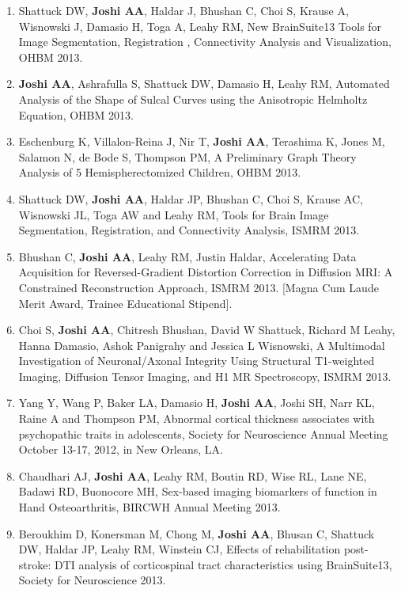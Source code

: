 \documentclass[overlapped,line,letterpaper]{res}
\begin{document}
\begin{resume}
\begin{enumerate}
    \item Shattuck DW, \textbf{Joshi AA}, Haldar J, Bhushan C, Choi S, Krause A, Wisnowski J, Damasio H, Toga A, Leahy RM, {New BrainSuite13 Tools for Image Segmentation, Registration , Connectivity Analysis and Visualization}, OHBM 2013.

    \item \textbf{Joshi AA}, Ashrafulla S, Shattuck DW, Damasio H, Leahy RM, {Automated Analysis of the Shape of Sulcal Curves using the Anisotropic Helmholtz Equation}, OHBM 2013.

    \item Eschenburg K, Villalon-Reina J, Nir T, \textbf{Joshi AA}, Terashima K, Jones M, Salamon N, de Bode S, Thompson PM, {A Preliminary Graph Theory Analysis of 5 Hemispherectomized Children}, OHBM 2013.

    \item Shattuck DW, \textbf{Joshi AA}, Haldar JP, Bhushan C, Choi S, Krause AC, Wisnowski JL, Toga AW and Leahy RM, {Tools for Brain Image Segmentation, Registration, and Connectivity Analysis}, ISMRM 2013. 

    \item Bhushan C, \textbf{Joshi AA}, Leahy RM, Justin Haldar, Accelerating Data Acquisition for Reversed-Gradient Distortion Correction in Diffusion MRI: A Constrained Reconstruction Approach, ISMRM 2013. [Magna Cum Laude Merit Award, Trainee Educational Stipend].

    \item Choi S, \textbf{Joshi AA}, Chitresh Bhushan, David W Shattuck, Richard M Leahy, Hanna Damasio, Ashok Panigrahy and Jessica L Wisnowski, A Multimodal Investigation of Neuronal/Axonal Integrity Using Structural T1-weighted Imaging, Diffusion Tensor Imaging, and H1 MR Spectroscopy, ISMRM 2013.

    \item Yang Y, Wang P, Baker LA, Damasio H, \textbf{Joshi AA}, Joshi SH, Narr KL, Raine A and Thompson PM, {Abnormal cortical thickness associates with psychopathic traits in adolescents}, Society for Neuroscience Annual Meeting October 13-17, 2012, in New Orleans, LA.

    \item Chaudhari AJ, \textbf{Joshi AA}, Leahy RM, Boutin RD, Wise RL, Lane NE, Badawi RD, Buonocore MH, {Sex-based imaging biomarkers of function in Hand Osteoarthritis}, BIRCWH Annual Meeting 2013.

    \item Beroukhim D, Konersman M, Chong M, \textbf{Joshi AA}, Bhusan C, Shattuck DW, Haldar JP, Leahy RM, Winstein CJ, {Effects of rehabilitation post-stroke: DTI analysis of corticospinal tract characteristics using BrainSuite13}, Society for Neuroscience 2013.


\end{enumerate}
\end{resume}
\end{document}
